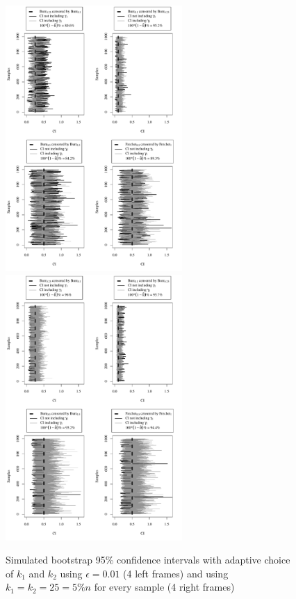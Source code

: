 \begin{landscape}
\begin{figure}[h]
		\centering
		\includegraphics[width=0.6\textwidth]{./plots/paper2/s001SimulatedCI.pdf}
		\includegraphics[width=0.6\textwidth]{./plots/paper2/k25SimulatedCI.pdf}
		\caption{Simulated bootstrap 95\% confidence intervals with adaptive choice of $k_1$ and $k_2$ using $\epsilon = 0.01$ (4 left frames) and using $k_1=k_2=25=5\%n$ for every sample (4 right frames)}
\label{paper2:fig6}
			\end{figure}
\end{landscape}

